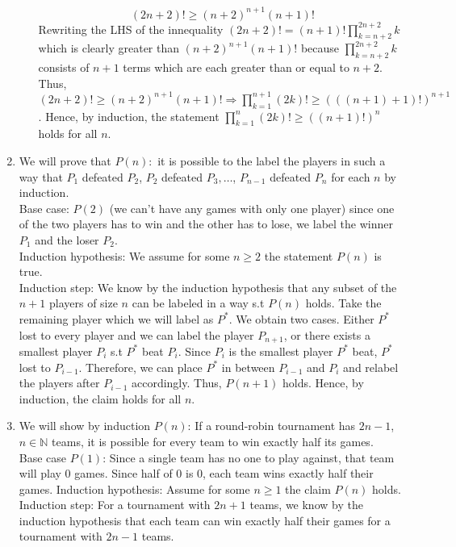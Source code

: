 \documentclass[10pt]{article}
\begin{document}
\begin{enumerate}[label= (Q-\arabic*)]
\begin{itemize}
        $$
        (2n+2)!\ge {(n+2)}^{n+1}(n+1)!
        $$
        Rewriting the LHS of the innequality 
        $(2n+2)!=\displaystyle(n+1)!\prod_{k=n+2}^{2n+2}k$ which is clearly greater than ${(n+2)}^{n+1}(n+1)!$ because $\displaystyle\prod_{k=n+2}^{2n+2}k$ consists of $n+1$ terms which are each greater than or equal to $n+2$.\\ 
        Thus, $(2n+2)!\ge {(n+2)}^{n+1}(n+1)!\Rightarrow \displaystyle\prod_{k=1}^{n+1}(2k)!\ge{(((n+1)+1)!)}^{n+1}$.
        Hence, by induction, the statement $\displaystyle\prod_{k=1}^{n}(2k)!\ge{((n+1)!)}^n$ holds for all $n$.
    \end{itemize}
    \item We will prove that $P(n):$ it is possible to the label the players in such a way that $P_1$ defeated $P_2$, $P_2$ defeated $P_3,\ldots$, $P_{n-1}$ defeated $P_n$ for each $n$ by induction.\\
        Base case: $P(2)$ (we can't have any games with only one player) since one of the two players has to win and the other has to lose, we label the winner $P_1$ and the loser $P_2$.\\
        Induction hypothesis: We assume for some $n\ge2$ the statement $P(n)$ is true.\\
        Induction step: We know by the induction hypothesis that any subset of the $n+1$ players of size $n$ can be labeled in a way s.t $P(n)$ holds.
        Take the remaining player which we will label as $P^*$. 
        We obtain two cases. 
        Either $P^*$ lost to every player and we can label the player $P_{n+1}$, or there exists a smallest player $P_i$ s.t $P^*$ beat $P_i$. 
        Since $P_i$ is the smallest player $P^*$ beat, $P^*$ lost to $P_{i-1}$. Therefore, we can place $P^*$ in between $P_{i-1}$ and $P_i$ and relabel the players after $P_{i-1}$ accordingly.
        Thus, $P(n+1)$ holds. Hence, by induction, the claim holds for all $n$.
    \item We will show by induction $P(n)$: If a round-robin tournament has $2n-1$, $n\in\mathbb{N}$ teams, it is possible for every team to
    win exactly half its games.\\
    Base case $P(1)$: Since a single team has no one to play against, that team will play $0$ games. Since half of $0$ is $0$, each team wins exactly half their games.
    Induction hypothesis: Assume for some $n\ge1$ the claim $P(n)$ holds.
    Induction step: For a tournament with $2n+1$ teams, we know by the induction hypothesis that each team can win exactly half their games for a tournament with $2n-1$ teams. 

\end{enumerate}
\end{document}
